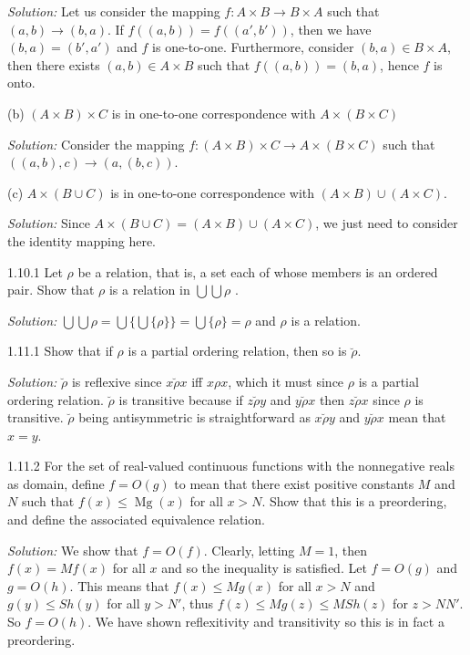 \documentclass{letter}
\newcommand{\tmop}[1]{\ensuremath{\operatorname{#1}}}
\newcommand{\tmtextit}[1]{{\itshape{#1}}}
\begin{document}
\tmtextit{Solution:} Let us consider the mapping $f : A \times B \rightarrow B
\times A$ such that $(a, b) \rightarrow (b, a)$. If $f ((a, b)) = f ((a',
b'))$, then we have $(b, a) = (b', a')$ and $f$ is one-to-one. Furthermore,
consider $(b, a) \in B \times A$, then there exists $(a, b) \in A \times B$
such that $f ((a, b)) = (b, a)$, hence $f$ is onto.

(b) $(A \times B) \times C$ is in one-to-one correspondence with $A \times (B
\times C)$

\tmtextit{Solution:} Consider the mapping $f : (A \times B) \times C
\rightarrow A \times (B \times C)$ such that $((a, b), c) \rightarrow (a, (b,
c))$.

(c) $A \times (B \cup C)$ is in one-to-one correspondence with $(A \times B)
\cup (A \times C)$.

\tmtextit{Solution:} Since $A \times (B \cup C) = (A \times B) \cup (A \times
C)$, we just need to consider the identity mapping here.

1.10.1 Let $\rho$ be a relation, that is, a set each of whose members is an
ordered pair. Show that $\rho$ is a relation in $\bigcup \bigcup \rho$ .

\tmtextit{Solution:} $\bigcup \bigcup \rho = \text{$\bigcup \{ \bigcup
\{\rho\}\}= \text{$\bigcup \{\rho\}= \rho$}$}$ and $\rho$ is a relation.

1.11.1 Show that if $\rho$ is a partial ordering relation, then so is
$\breve{\rho}$.

\tmtextit{Solution:} $\breve{\rho}$ is reflexive since $x
\text{$\breve{\rho}$} x$ iff $x \rho x$, which it must since $\rho$ is a
partial ordering relation. $\breve{\rho}$ is transitive because if $z
\text{$\breve{\rho}$} y$ and $y \text{$\breve{\rho}$} x$ then $z
\text{$\breve{\rho}$} x$ since $\rho$ is transitive. $\breve{\rho}$ being
antisymmetric is straightforward as $x \text{$\breve{\rho}$} y$ and $y
\text{$\breve{\rho}$} x$ mean that $x = y$.

1.11.2 For the set of real-valued continuous functions with the nonnegative
reals as domain, define $f = O (g)$ to mean that there exist positive
constants $M$ and $N$ such that $f (x) \leq \tmop{Mg} (x)$ for all $x > N$.
Show that this is a preordering, and define the associated equivalence
relation.

\tmtextit{Solution:} We show that $f = O (f)$. Clearly, letting $M = 1$, then
$f (x) = M f (x)$ for all $x$ and so the inequality is satisfied. Let $f = O
(g)$ and $g = O (h)$. This means that $f (x) \leq M g (x)$ for all $x > N$ and
$g (y) \leq S h (y)$ for all $y > N'$, thus $f (z) \leq M g (z) \leq M S h
(z)$ for $z > N N'$. So $f = O (h)$. We have shown reflexitivity and
transitivity so this is in fact a preordering.
\end{document}
